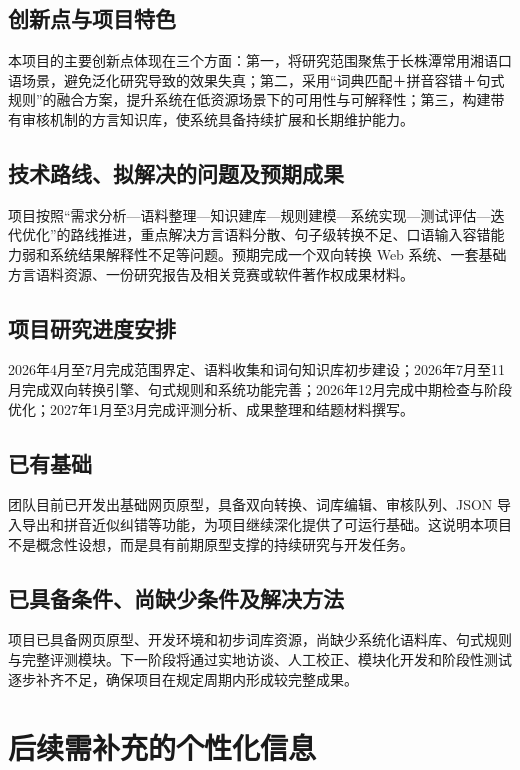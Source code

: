 \documentclass[12pt,a4paper]{ctexart}
\begin{document}
\subsection{创新点与项目特色}

本项目的主要创新点体现在三个方面：第一，将研究范围聚焦于长株潭常用湘语口语场景，避免泛化研究导致的效果失真；第二，采用“词典匹配＋拼音容错＋句式规则”的融合方案，提升系统在低资源场景下的可用性与可解释性；第三，构建带有审核机制的方言知识库，使系统具备持续扩展和长期维护能力。

\subsection{技术路线、拟解决的问题及预期成果}

项目按照“需求分析—语料整理—知识建库—规则建模—系统实现—测试评估—迭代优化”的路线推进，重点解决方言语料分散、句子级转换不足、口语输入容错能力弱和系统结果解释性不足等问题。预期完成一个双向转换 Web 系统、一套基础方言语料资源、一份研究报告及相关竞赛或软件著作权成果材料。

\subsection{项目研究进度安排}

2026年4月至7月完成范围界定、语料收集和词句知识库初步建设；2026年7月至11月完成双向转换引擎、句式规则和系统功能完善；2026年12月完成中期检查与阶段优化；2027年1月至3月完成评测分析、成果整理和结题材料撰写。

\subsection{已有基础}

团队目前已开发出基础网页原型，具备双向转换、词库编辑、审核队列、JSON 导入导出和拼音近似纠错等功能，为项目继续深化提供了可运行基础。这说明本项目不是概念性设想，而是具有前期原型支撑的持续研究与开发任务。

\subsection{已具备条件、尚缺少条件及解决方法}

项目已具备网页原型、开发环境和初步词库资源，尚缺少系统化语料库、句式规则与完整评测模块。下一阶段将通过实地访谈、人工校正、模块化开发和阶段性测试逐步补齐不足，确保项目在规定周期内形成较完整成果。

\section{后续需补充的个性化信息}
\end{document}
